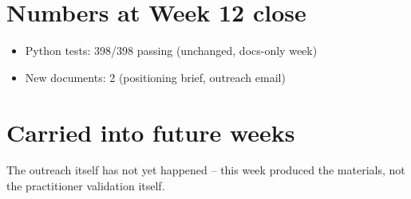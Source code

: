 \documentclass[11pt]{article}
\begin{document}
\section*{Numbers at Week 12 close}
\begin{itemize}[leftmargin=*]
  \item Python tests: 398/398 passing (unchanged, docs-only week)
  \item New documents: 2 (positioning brief, outreach email)
\end{itemize}

\section*{Carried into future weeks}
The outreach itself has not yet happened -- this week produced the
materials, not the practitioner validation itself.
\end{document}
